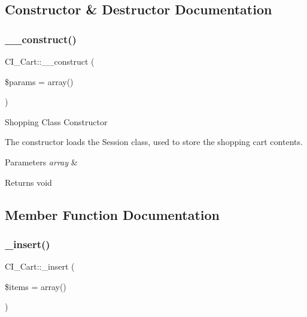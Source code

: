\subsection{Constructor \& Destructor Documentation}
\mbox{\label{class_c_i___cart_a714238bb292818961e0055d626aeec6e}} 
\subsubsection{\texorpdfstring{\+\_\+\+\_\+construct()}{\_\_construct()}}
{\footnotesize\ttfamily C\+I\+\_\+\+Cart\+::\+\_\+\+\_\+construct (\begin{DoxyParamCaption}\item[{}]{\$params = {\ttfamily array()} }\end{DoxyParamCaption})}

Shopping Class Constructor

The constructor loads the Session class, used to store the shopping cart contents.


\begin{DoxyParams}{Parameters}
{\em array} & \\
\hline
\end{DoxyParams}
\begin{DoxyReturn}{Returns}
void 
\end{DoxyReturn}


\subsection{Member Function Documentation}
\mbox{\label{class_c_i___cart_aef4c24fed660b4f1e088cc5dd6dce6b4}} 
\subsubsection{\texorpdfstring{\+\_\+insert()}{\_insert()}}
{\footnotesize\ttfamily C\+I\+\_\+\+Cart\+::\+\_\+insert (\begin{DoxyParamCaption}\item[{}]{\$items = {\ttfamily array()} }\end{DoxyParamCaption})\hspace{0.3cm}{\ttfamily [protected]}}


